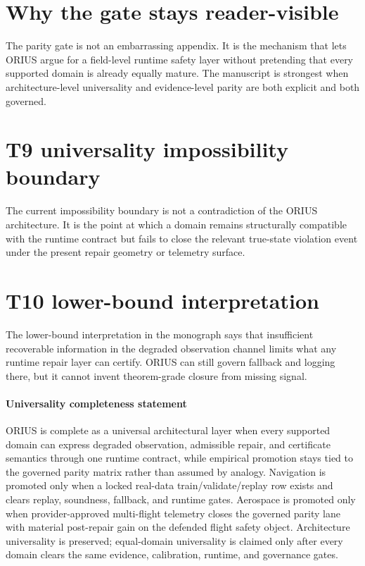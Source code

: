 \section{Why the gate stays reader-visible}
The parity gate is not an embarrassing appendix.  It is the mechanism that lets ORIUS
argue for a field-level runtime safety layer without pretending that every supported
domain is already equally mature.  The manuscript is strongest when
architecture-level universality and evidence-level parity are both explicit and both
governed.

\section{T9 universality impossibility boundary}
\label{sec:monograph-t9-universal-impossibility}
The current impossibility boundary is not a contradiction of the ORIUS architecture.
It is the point at which a domain remains structurally compatible with the runtime
contract but fails to close the relevant true-state violation event under the present
repair geometry or telemetry surface.

\section{T10 lower-bound interpretation}
\label{sec:monograph-t10-lower-bound}
The lower-bound interpretation in the monograph says that insufficient recoverable
information in the degraded observation channel limits what any runtime repair layer
can certify.  ORIUS can still govern fallback and logging there, but it cannot invent
theorem-grade closure from missing signal.

\paragraph{Universality completeness statement}
\label{par:monograph-universality-completeness}
ORIUS is complete as a universal architectural layer when every supported domain can
express degraded observation, admissible repair, and certificate semantics through one
runtime contract, while empirical promotion stays tied to the governed parity matrix
rather than assumed by analogy. Navigation is promoted only when a locked real-data train/validate/replay row exists and clears replay, soundness, fallback, and runtime gates. Aerospace is promoted only when provider-approved multi-flight telemetry closes the governed parity lane with material post-repair gain on the defended flight safety object. Architecture universality is preserved; equal-domain universality is claimed only after every domain clears the same evidence, calibration, runtime, and governance gates.
